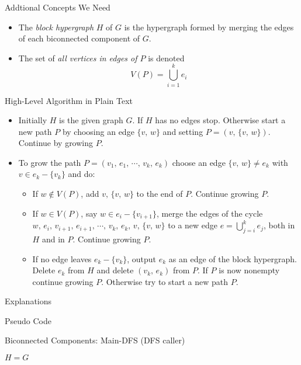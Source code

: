 \documentclass{beamer}
\begin{document}
\begin{frame}{Addtional Concepts We Need}
	\begin{itemize}
		\item
		The \emph{block hypergraph} $H$ of $G$ is the hypergraph formed by merging the edges of each biconnected component of $G$.
		\item
		The set of \emph{all vertices in edges of $P$} is denoted
		$$V(P)=\bigcup_{i=1}^ke_i$$
	\end{itemize}
\end{frame}

\begin{frame}{High-Level Algorithm in Plain Text}
	\begin{itemize}
		\item
		Initially $H$ is the given graph $G$. If $H$ has no edges stop. Otherwise start a new path $P$ by choosing an edge 
		$\{v,\,w\}$ and setting $P=(v,\,\{v,\,w\})$. Continue by growing $P$.
		\item
		To grow the path $P=(v_1,\,e_1,\,\cdots,\,v_k,\,e_k)$ choose an edge $\{v,\,w\}\neq e_k$ with $v\in e_k-\{v_k\}$ and do:
		\begin{itemize}
			\item
			If $w\notin V(P)$, add $v,\,\{v,\,w\}$ to the end of $P$. Continue growing $P$.
			\item
			If $w\in V(P)$, say $w\in e_i-\{v_{i+1}\}$, merge the edges of the cycle $w,\,e_i,\,v_{i+1},\,e_{i+1},\,\cdots,\,v_k,\,e_k,\,v,\,\{v,\,w\}$
			to a new edge $e=\bigcup_{j=i}^ke_j$, both in $H$ and in $P$. Continue growing $P$.
			\item
			If no edge leaves $e_k-\{v_k\}$, output $e_k$ as an edge of the block hypergraph. Delete $e_k$ from $H$ and delete $(v_k,\,e_k)$
			from $P$. If $P$ is now nonempty continue growing $P$. Otherwise try to start a new path $P$.
		\end{itemize}
	\end{itemize}
\end{frame}

\begin{frame}{Explanations}
	\begin{itemize}
	\end{itemize}
\end{frame}

\begin{frame}{Pseudo Code}
	\SetAlFnt{\small}
	\begin{algorithm}[H]
		\caption{Biconnected Components: Main-DFS (DFS caller)}
		$H=G$\;
	\end{algorithm}
\end{frame}
\end{document}

